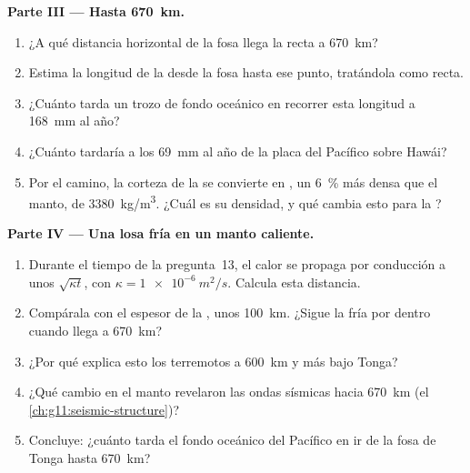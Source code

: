 \begin{problem}
\medskip
\noindent\textbf{Parte III --- Hasta \qty{670}{km}.}
\begin{enumerate}[resume]
  \item ¿A qué distancia horizontal de la fosa llega la recta a
        \qty{670}{km}?
  \item Estima la longitud de la  desde la fosa hasta ese punto,
        tratándola como recta.
  \item ¿Cuánto tarda un trozo de fondo oceánico en recorrer esta longitud a
        \qty{168}{mm} al año?
  \item ¿Cuánto tardaría a los \qty{69}{mm} al año de la placa del Pacífico
        sobre Hawái?
  \item Por el camino, la corteza de la  se convierte en , un
        \qty{6}{\percent} más densa que el manto, de \qty{3380}{kg/m^3}. ¿Cuál
        es su densidad, y qué cambia esto para la ?
\end{enumerate}

\medskip
\noindent\textbf{Parte IV --- Una losa fría en un manto caliente.}
\begin{enumerate}[resume]
  \item Durante el tiempo de la pregunta~13, el calor se propaga por
        conducción a unos $\sqrt{\kappa t}$, con $\kappa = \qty{1e-6}{m^2/s}$.
        Calcula esta distancia.
  \item Compárala con el espesor de la , unos \qty{100}{km}. ¿Sigue la
         fría por dentro cuando llega a \qty{670}{km}?
  \item ¿Por qué explica esto los terremotos a \qty{600}{km} y más bajo
        Tonga?
  \item ¿Qué cambio en el manto revelaron las ondas sísmicas hacia
        \qty{670}{km} (el \cref{ch:g11:seismic-structure})?
  \item Concluye: ¿cuánto tarda el fondo oceánico del Pacífico en ir de la
        fosa de Tonga hasta \qty{670}{km}?
\end{enumerate}
\end{problem}
